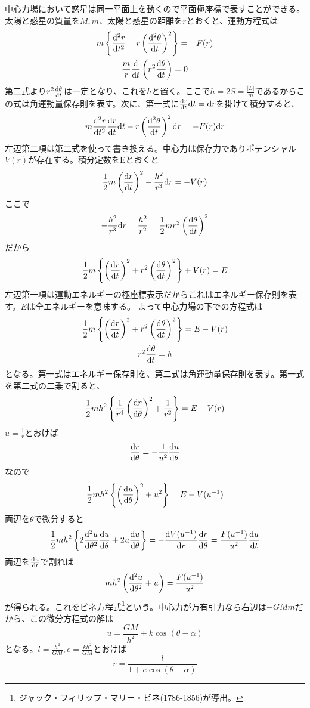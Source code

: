 	中心力場において惑星は同一平面上を動くので平面極座標で表すことができる。太陽と惑星の質量を$M, m$、太陽と惑星の距離を$r$とおくと、運動方程式は
	\begin{gather*}
		m \mlr{ \de[^2r]{t^2} - r\lr{ \de[^2\theta]{t} }^2 } = - F(r)\\
		\frac{m}{r} \de{t} \lr{ r^2\de[\theta]{t} } = 0\\
	\end{gather*}
	第二式より$r^2\de[\theta]{t}$は一定となり、これを$h$と置く。ここで$h = 2S = \frac{|L|}{m}$であるからこの式は角運動量保存則を表す。次に、第一式に$\de[r]{t}\d t = \d r$を掛けて積分すると、
	\[m\de[^2r]{t^2}\de[r]{t}\d t - r\lr{ \de[^2\theta]{t} }^2\d r = - F(r)\d r\]
左辺第二項は第二式を使って書き換える。中心力は保存力でありポテンシャル$V(r)$が存在する。積分定数をEとおくと
	\[\frac{1}{2}m\lr{\de[r]{t}}^2 - \frac{h^2}{r^3}\d r = - V(r)\]
ここで
	\[- \frac{h^2}{r^3}\d r = \frac{h^2}{r^2}
		= \frac{1}{2}mr^2\lr{ \de[\theta]{t} }^2\]
だから
	\[\frac{1}{2}m\mlr{ \lr{\de[r]{t}}^2 + r^2\lr{ \de[\theta]{t} }^2 } + V(r) = E\]
左辺第一項は運動エネルギーの極座標表示だからこれはエネルギー保存則を表す。$E$は全エネルギーを意味する。
	よって中心力場の下での方程式は
	\begin{gather*}
		\frac{1}{2}m\mlr{ \lr{\de[r]{t}}^2 + r^2\lr{ \de[\theta]{t} }^2 } = E - V(r)\\
		r^2\de[\theta]{t} = h\\
	\end{gather*}
	となる。第一式はエネルギー保存則を、第二式は角運動量保存則を表す。第一式を第二式の二乗で割ると、
		\[\frac{1}{2}mh^2 \mlr{ \frac{1}{r^4}\lr{\de[r]{\theta}}^2 + \frac{1}{r^2} } = E - V(r)\]
	$u = \frac{1}{r}$とおけば
		\[\de[r]{\theta} = - \frac{1}{u^2}\de[u]{\theta}\]
	なので
		\[\frac{1}{2}mh^2\mlr{ \lr{\de[u]{\theta}}^2 + u^2 } = E - V(u^{-1})\]
	両辺を$\theta$で微分すると
	    \[\frac{1}{2}mh^2\mlr{ 2\de[^2u]{\theta^2}\de[u]{\theta} + 2u\de[u]{\theta} } = - \de[V(u^{-1})]{r}\de[r]{\theta} = \frac{F(u^{-1})}{u^2}\de[u]{t}\]
    両辺を$\de[u]{t}$で割れば
		\[mh^2\lr{ \de[^2u]{\theta^2} + u } = \frac{F(u^{-1})}{u^2}\]
	が得られる。これをビネ方程式\footnote{ジャック・フィリップ・マリー・ビネ(1786-1856)が導出。}という。中心力が万有引力なら右辺は$-GMm$だから、この微分方程式の解は
		\[u = \frac{GM}{h^2} + k\cos(\theta - \alpha)\]
    となる。$l = \frac{h^2}{GM}, e = \frac{kh^2}{GM}$とおけば
		\[r = \frac{l}{1 + e\cos(\theta - \alpha)}\]
